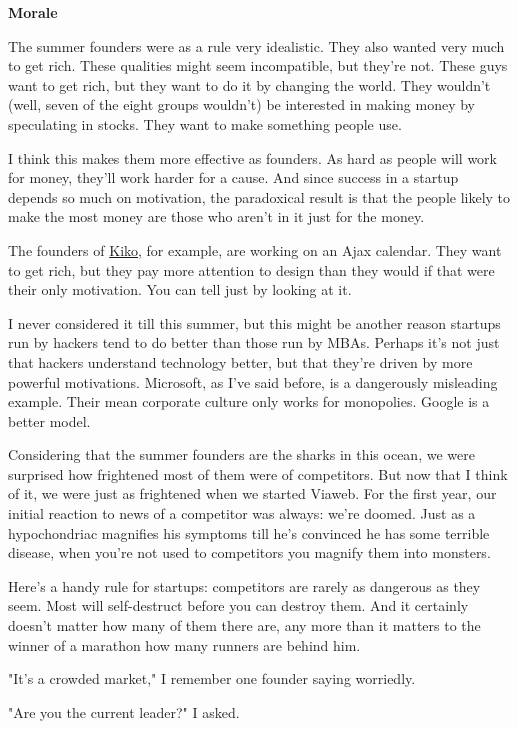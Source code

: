 \textbf{Morale}

The summer founders were as a rule very idealistic.  They also  
wanted very much to get rich.  These qualities might seem incompatible,
but they're not.  These guys want to get rich, but they want to do
it by changing the world.  They wouldn't (well, seven of the eight
groups wouldn't) be interested in making money by speculating in
stocks.  They want to make something people use.

I think this makes them more effective as founders.  As hard as  
people will work for money, they'll work harder for a cause.  And   
since success in a startup depends so much on motivation, the
paradoxical result is that the people likely to make the most money
are those who aren't in it just for the money.

The founders of \href{http://kiko.com}{Kiko}, for example,   
are working on an Ajax calendar.  They want to get rich, but they
pay more attention to design than they would if that were their
only motivation.  You can tell just by looking at it.

I never considered it till this summer, but this might be another
reason startups run by hackers tend to do better than those run by
MBAs.  Perhaps it's not just that hackers understand technology
better, but that they're driven by more powerful motivations.
Microsoft, as I've said before, is a dangerously misleading example.  
Their mean corporate culture only works for monopolies.   
Google is a better model.

Considering that the summer founders are the sharks in this ocean,
we were surprised how frightened most of them were of competitors.
But now that I think of it, we were just as frightened when we
started Viaweb.  For the first year, our initial reaction to news 
of a competitor was always: we're doomed.  Just as a hypochondriac
magnifies his symptoms till he's convinced he has some terrible
disease, when you're not used to competitors you magnify them into
monsters.

Here's a handy rule for startups: competitors are rarely as dangerous
as they seem.  Most will self-destruct before you can destroy them.
And it certainly doesn't matter how many of them there are, any
more than it matters to the winner of a marathon how many runners
are behind him.

"It's a crowded market," I remember one founder saying worriedly.

"Are you the current leader?" I asked.

